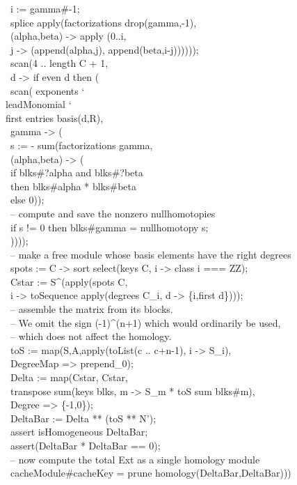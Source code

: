 \begin{code}
\        i := gamma#-1;\\
\        splice apply(factorizations drop(gamma,-1), \\
\          (alpha,beta) -> apply (0..i, \\
\               j -> (append(alpha,j), append(beta,i-j))))));\\
\    scan(4 .. length C + 1, \\
\      d -> if even d then (\\
\        scan( exponents {\char`\\} leadMonomial {\char`\\} first entries basis(d,R), \\
\          gamma -> (\\
\            s := - sum(factorizations gamma,\\
\              (alpha,beta) -> (\\
\                if blks#?alpha and blks#?beta\\
\                then blks#alpha * blks#beta\\
\                else 0));\\
\            -- compute and save the nonzero nullhomotopies\\
\            if s != 0 then blks#gamma = nullhomotopy s;\\
\            ))));\\
\    -- make a free module whose basis elements have the right degrees\\
\    spots := C -> sort select(keys C, i -> class i === ZZ);\\
\    Cstar := S^(apply(spots C,\\
\        i -> toSequence apply(degrees C_i, d -> \{i,first d\})));\\
\    -- assemble the matrix from its blocks.\\
\    -- We omit the sign (-1)^(n+1) which would ordinarily be used,\\
\    -- which does not affect the homology.\\
\    toS := map(S,A,apply(toList(c .. c+n-1), i -> S_i),\\
\      DegreeMap => prepend_0);\\
\    Delta := map(Cstar, Cstar, \\
\      transpose sum(keys blks, m -> S_m * toS sum blks#m),\\
\      Degree => \{-1,0\});\\
\    DeltaBar := Delta ** (toS ** N');\\
\    assert isHomogeneous DeltaBar;\\
\    assert(DeltaBar * DeltaBar == 0);\\
\    -- now compute the total Ext as a single homology module\\
\    cacheModule#cacheKey = prune homology(DeltaBar,DeltaBar)))\\
\endOutput
\end{code}

